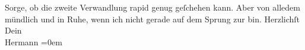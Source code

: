 \begin{ledgroupsized}[t]{13cm}
               Sorge, ob die zweite Verwandlung rapid genug geſchehen kann. Aber von alledem
               mündlich und \introOben{}in\introOben{} Ruhe, wenn ich nicht gerade auf dem Sprung
               zur \label{K_L01172_2v}\label{K_L01172_2h} bin.\pend
           \pstart
           Herzlichſt{\\[\baselineskip]}Dein{\\[\baselineskip]}\spacefill\mbox{Hermann}\pend
           \leftskip=0em{}
         
         \endnumbering{}\end{ledgroupsized}  \newcommand{\dateiname}{L01172}\newcommand{\titel}{Hermann Bahr an Arthur Schnitzler, 12. 9. 1901}\newcommand{\editorInnen}{ Kurt Ifkovits,  Martin Anton Müller}
      